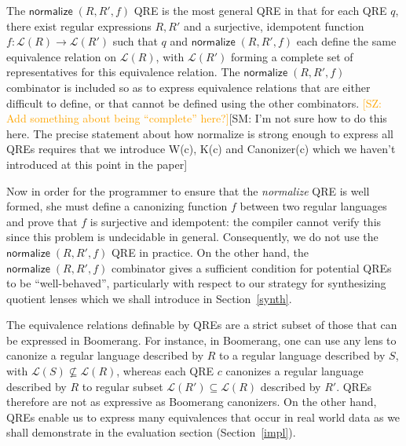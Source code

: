 \documentclass[acmsmall,review,anonymous]{acmart}\settopmatter{printfolios=true,printccs=false,printacmref=false}
\newcommand{\FINISH}[3]{\ifdraft\textcolor{#1}{[#2: #3]}\fi}
\newcommand{\saz}[1]{\FINISH{orange}{SZ}{#1}}
\newcommand{\sam}[1]{\FINISH{dkpurple}{SM}{#1}}
\newcommand{\kw}[1]{\ensuremath{\mathsf{#1}}}
\newcommand{\normalize}[3]{\ensuremath{\kw{normalize} \; (#1, #2, #3)}}
\begin{document}
The $\normalize{R}{R'}{f}$ QRE is the most general QRE in that for each QRE
$q$, there exist regular expressions $R, R'$ and a surjective, idempotent
function $f:\mathcal{L}(R) \longrightarrow \mathcal{L}(R')$ such that $q$ and
$\normalize{R}{R'}{f}$ each define the same equivalence relation on
$\mathcal{L}(R)$, with $\mathcal{L}(R')$ forming a complete set of
representatives for this equivalence relation. The $\normalize{R}{R'}{f}$
combinator is included so as to express equivalence relations that are either
difficult to define, or that cannot be defined using the other combinators.
\saz{Add something about being ``complete'' here?}\sam{I'm not sure how to do
this here. The precise statement about how normalize is strong enough to
express all QREs requires that we introduce W(c), K(c) and Canonizer(c) which
we haven't introduced at this point in the paper}

Now in order for the programmer to ensure that the {\em normalize} QRE is well
formed, she must define a canonizing function $f$ between two regular
languages and prove that $f$ is surjective and idempotent: the compiler cannot
verify this since this problem is undecidable in general. Consequently, we do
not use the $\normalize{R}{R'}{f}$ QRE in practice. On the other hand, the
$\normalize{R}{R'}{f}$ combinator gives a sufficient condition for potential
QREs to be ``well-behaved'', particularly with respect to our strategy for
synthesizing quotient lenses which we shall introduce in Section~\ref{synth}.

The equivalence relations definable by QREs are a strict subset of those that
can be expressed in Boomerang. For instance, in Boomerang, one can use any lens
to canonize a regular language described by $R$ to a regular language described
by $S$, with $\mathcal{L}(S) \not \subseteq \mathcal{L}(R)$, whereas each QRE
$c$ canonizes a regular language described by $R$ to regular subset
$\mathcal{L}(R') \subseteq \mathcal{L}(R)$ described by $R'$. QREs therefore are
not as expressive as Boomerang canonizers. On the other hand, QREs enable us to
express many equivalences that occur in real world data as we shall demonstrate
in the evaluation section (Section~\ref{impl}).
\end{document}

